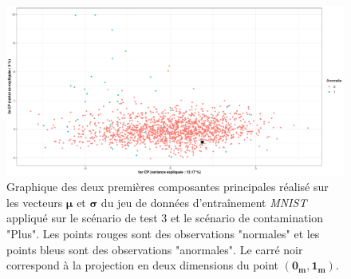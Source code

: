 \begin{figure}[htb]
	\centering
	\centering\includegraphics[width=\linewidth]{images/plot_pca_mnist}
	\DIFdelbeginFL %
\DIFdelendFL \DIFaddbeginFL \caption[Graphique des deux premières composantes principales réalisé sur les vecteurs $\boldsymbol{\mu}$ et $\boldsymbol{\sigma}$ du jeu de données d'entraînement \textit{MNIST}.]{\DIFaddendFL Graphique des deux premières composantes principales réalisé sur les vecteurs $\boldsymbol{\mu}$ et $\boldsymbol{\sigma}$ du jeu de données d'entraînement \textit{MNIST} appliqué sur le scénario de test 3 et le scénario de contamination "Plus". Les points rouges sont des observations "normales" et les points bleus sont des observations "anormales". Le carré noir correspond à la projection en deux dimensions du point $(\boldsymbol{0_{m}}, \boldsymbol{1_{m}})$.}
	\label{fig:pca_mnist}
\end{figure}

